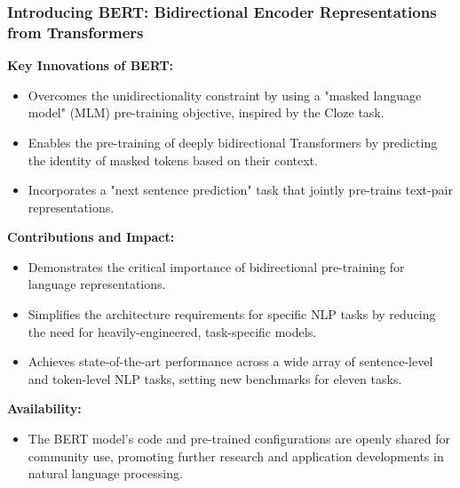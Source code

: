 \documentclass[11pt,xcolor={dvipsnames},hyperref={pdftex,pdfpagemode=UseNone,hidelinks,pdfdisplaydoctitle=true},usepdftitle=false]{beamer}
\begin{document}
\begin{frame}
\frametitle{Introducing BERT: Bidirectional Encoder Representations from Transformers}
\textbf{Key Innovations of BERT:}
\begin{itemize}
    \item Overcomes the unidirectionality constraint by using a "masked language model" (MLM) pre-training objective, inspired by the Cloze task.
    \item Enables the pre-training of deeply bidirectional Transformers by predicting the identity of masked tokens based on their context.
    \item Incorporates a "next sentence prediction" task that jointly pre-trains text-pair representations.
\end{itemize}
\textbf{Contributions and Impact:}
\begin{itemize}
    \item Demonstrates the critical importance of bidirectional pre-training for language representations.
    \item Simplifies the architecture requirements for specific NLP tasks by reducing the need for heavily-engineered, task-specific models.
    \item Achieves state-of-the-art performance across a wide array of sentence-level and token-level NLP tasks, setting new benchmarks for eleven tasks.
\end{itemize}
\textbf{Availability:}
\begin{itemize}
    \item The BERT model's code and pre-trained configurations are openly shared for community use, promoting further research and application developments in natural language processing.
\end{itemize}
\end{frame}
    
\end{document}
